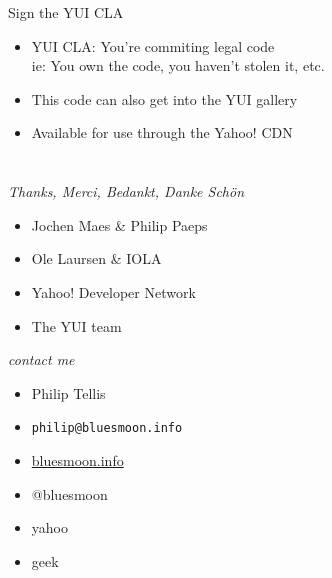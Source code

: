 \documentclass{beamer}
\begin{document}
\begin{frame}{Sign the YUI CLA}
  \begin{itemize}
  \item YUI CLA: You're commiting legal code \\ \footnotesize{ie: You own the code, you haven't stolen it, etc.}
  \item This code can also get into the YUI gallery
  \item Available for use through the Yahoo! CDN
  \end{itemize}
\end{frame}

\section{}
\begin{frame}{\textit{Thanks, Merci, Bedankt, Danke Sch\"on}}
  \begin{itemize}
  \item Jochen Maes \& Philip Paeps
  \item Ole Laursen \& IOLA
  \item Yahoo! Developer Network
  \item The YUI team
  \end{itemize}
\end{frame}

\begin{frame}{\textit{contact me}}
  \begin{itemize}
  \item Philip Tellis
  \item \small{\texttt{philip@bluesmoon.info}}
  \item \href{http://bluesmoon.info/}{bluesmoon.info}
  \item @bluesmoon
  \item yahoo
  \item geek
  \end{itemize}
\end{frame}
\end{document}
